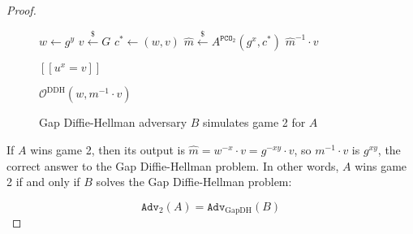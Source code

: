 \documentclass[journal=tches,submission]{iacrtrans}
\newcommand{\pco}{\texttt{PCO}}
\newcommand{\leftsample}{\stackrel{\$}{\leftarrow}}
\newcommand{\llbrack}{[\![}
\newcommand{\rrbrack}{]\!]}
\newcommand{\adv}{\texttt{Adv}}
\begin{document}
\begin{proof}
\begin{figure}
        \begin{minipage}[t]{0.45\textwidth}
            \begin{algorithm}[H]
                \caption*{$B^{\mathcal{O}^\text{DDH}}(g, g^x, g^y)$}
                \begin{algorithmic}[1]
                    \State $w \leftarrow g^y$
                    \State $v \leftsample G$
                    \State $c^\ast \leftarrow (w, v)$
                    \State $\hat{m} \leftsample A^{\pco_2}(g^x, c^\ast)$
                    \State \Return $\hat{m}^{-1}\cdot v$
                \end{algorithmic}
            \end{algorithm}
        \end{minipage}
        \begin{minipage}[t]{0.45\textwidth}
            \begin{algorithm}[H]
                \caption*{$\mathcal{O}^\text{DDH}(u, v)$}
                \begin{algorithmic}[1]
                    \State \Return $\llbrack u^x = v \rrbrack$
                \end{algorithmic}
            \end{algorithm}\vspace{-0.3cm}
            \begin{algorithm}[H]
                \caption*{$\pco_2(m, c=(w, v))$}
                \begin{algorithmic}[1]
                    \State \Return $\mathcal{O}^\text{DDH}(w, m^{-1}\cdot v)$
                \end{algorithmic}
            \end{algorithm}
        \end{minipage}

        \caption{Gap Diffie-Hellman adversary $B$ simulates game 2 for $A$}\label{fig:ow-pca-to-gap-dh}
    \end{figure}

    If $A$ wins game 2, then its output is $\hat{m} = w^{-x}\cdot v = g^{-xy}\cdot v$, so $m^{-1}\cdot v$ is $g^{xy}$, the correct answer to the Gap Diffie-Hellman problem. In other words, $A$ wins game 2 if and only if $B$ solves the Gap Diffie-Hellman problem:

    \begin{equation*}
        \adv_2(A) = \adv_\text{GapDH}(B)
    \end{equation*}
\end{proof}
\end{document}
